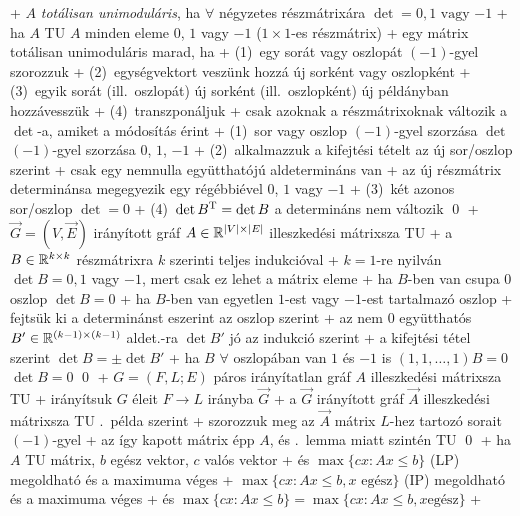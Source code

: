 + \dfn $A$ \emph{totálisan unimoduláris}, ha $\forall$ négyzetes
  részmátrixára $\det = 0, 1 \text{ vagy } {-1}$
  + \corr ha $A$ TU \RA $A$ minden eleme $0$, $1$ vagy $-1$ ($1 \times
    1$-es részmátrix)
+ \lemma \label{lem:linprog:ip:tu}egy mátrix totálisan unimoduláris marad, ha
  + (1)~egy sorát vagy oszlopát $(-1)$-gyel szorozzuk
  + (2)~egységvektort veszünk hozzá új sorként vagy oszlopként
  + (3)~egyik sorát (ill.~oszlopát) új sorként (ill.~oszlopként) új
    példányban hozzávesszük
  + (4)~transzponáljuk
  + \proof csak azoknak a részmátrixoknak változik a $\det$-a,
    amiket a módosítás érint
    + (1)~sor vagy oszlop $(-1)$-gyel szorzása \RA $\det$ $(-1)$-gyel
      szorzása \RA $0$, $1$, $-1$
    + (2)~alkalmazzuk a kifejtési tételt az új sor/oszlop szerint
      + csak egy nemnulla együtthatójú aldetermináns van
      + az új részmátrix determinánsa megegyezik egy régébbiével \RA%
        $0$, $1$ vagy $-1$
    + (3)~két azonos sor/oszlop \RA $\det = 0$
    + (4)~$\det B^{\mathrm{T}} = \det B$ \RA a determináns nem változik \qed
+ \example \label{ex:linprog:ip:directed}$\vec{G} = (V, \vec{E})$ irányított gráf $A \in \mathbb{R}^{\lvert
  V \rvert \times \lvert E \rvert}$ illeszkedési
  mátrixsza TU
  + \proof a $B \in \mathbb{R}^{k \times k}$ részmátrixra $k$ szerinti teljes
    indukcióval
    + $k = 1$-re nyilván $\det B = 0, 1$ vagy $-1$, mert csak ez lehet
      a mátrix eleme
    + ha $B$-ben van csupa $0$ oszlop \RA $\det B = 0$
    + ha $B$-ben van egyetlen $1$-est vagy $-1$-est tartalmazó oszlop
      + fejtsük ki a determinánst eszerint az oszlop szerint
      + az nem $0$ együtthatós $B' \in \mathbb{R}^{(k - 1) \times (k
        - 1)}$ aldet.-ra $\det B'$ jó az indukció  szerint
      + a kifejtési tétel szerint $\det B = \pm \det B'$
    + ha $B$ $\forall$ oszlopában van $1$ és $-1$ is \RA $(1, 1,
      \ldots, 1) B = 0$ \RA $\det B = 0$ \qed
+ \example \label{ex:linprog:ip:bipartite}$G = (F, L; E)$ páros irányítatlan gráf $A$ illeszkedési
  mátrixsza TU
  + \proof irányítsuk $G$ éleit $F \to L$ irányba \RA $\vec{G}$
    + a $\vec{G}$ irányított gráf $\vec{A}$ illeszkedési mátrixsza TU
      .~példa szerint
    + szorozzuk meg az $\vec{A}$ mátrix $L$-hez tartozó sorait $(-1)$-gyel
    + az így kapott mátrix épp $A$, és .~lemma
      miatt szintén TU \qed
+ \thm \label{ex:linprog:ip:iplp}ha $A$ TU mátrix, $b$ egész vektor, $c$ valós vektor
  + és $\max \{ cx : Ax \le b \}$ (LP) megoldható és a maximuma véges
  + \RA $\max \{ cx : Ax \le b, x \text{ egész} \}$ (IP) megoldható és
    a maximuma véges
  + és $\max \{ cx : Ax \le b \} = \max \{ cx : Ax \le b, x \text{
    egész} \}$
  + \noproof

